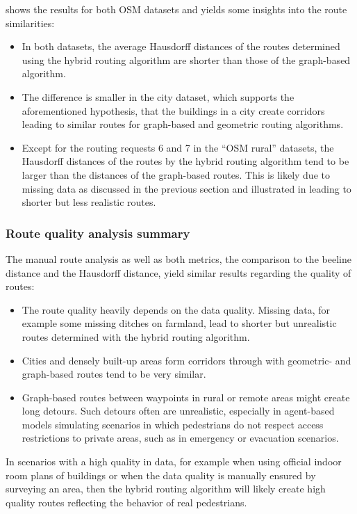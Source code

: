 			 shows the results for both OSM datasets and yields some insights into the route similarities:
			\begin{itemize}
				\item In both datasets, the average Hausdorff distances of the routes determined using the hybrid routing algorithm are shorter than those of the graph-based algorithm.
				\item The difference is smaller in the city dataset, which supports the aforementioned hypothesis, that the buildings in a city create corridors leading to similar routes for graph-based and geometric routing algorithms.
				\item Except for the routing requests 6 and 7 in the \enquote{OSM rural} datasets, the Hausdorff distances of the routes by the hybrid routing algorithm tend to be larger than the distances of the graph-based routes.
				This is likely due to missing data as discussed in the previous section and illustrated in  leading to shorter but less realistic routes.
			\end{itemize}

		\subsubsection{Route quality analysis summary}
			
			The manual route analysis as well as both metrics, the comparison to the beeline distance and the Hausdorff distance, yield similar results regarding the quality of routes:
			
			\begin{itemize}
				\item The route quality heavily depends on the data quality.
				Missing data, for example some missing ditches on farmland, lead to shorter but unrealistic routes determined with the hybrid routing algorithm.
				\item Cities and densely built-up areas form corridors through with geometric- and graph-based routes tend to be very similar.
				\item Graph-based routes between waypoints in rural or remote areas might create long detours.
				Such detours often are unrealistic, especially in agent-based models simulating scenarios in which pedestrians do not respect access restrictions to private areas, such as in emergency or evacuation scenarios.
			\end{itemize}
			\noindent
			In scenarios with a high quality in data, for example when using official indoor room plans of buildings or when the data quality is manually ensured by surveying an area, then the hybrid routing algorithm will likely create high quality routes reflecting the behavior of real pedestrians.